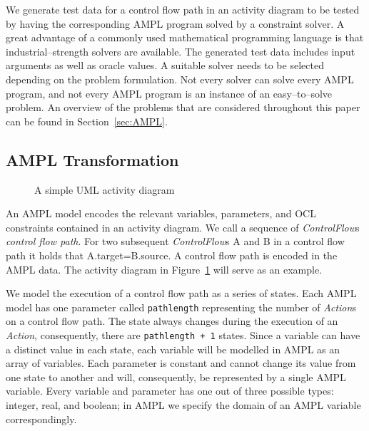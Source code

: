 \documentclass[runningheads,a4paper]{llncs}%
\newcommand{\UMLType}[1]{\textsf{\textit{#1}}} %
\newcommand{\UMLReference}[1]{\textsf{\textit{#1}}} %
\newcommand{\AMPLCode}[1]{\texttt{#1}}
\begin{document}
We generate test data for a control flow path in an activity diagram to be
tested by having the corresponding AMPL program solved by a constraint solver.
A great advantage of a commonly used mathematical programming language is that
industrial--strength solvers are available. The generated test data includes
input arguments as well as oracle values. A suitable solver needs to be selected
depending on the problem formulation. Not every solver can solve every AMPL
program, and not every AMPL program is an instance of an easy--to--solve
problem. An overview of the problems that are considered throughout this paper
can be found in Section~\ref{sec:AMPL}.
\subsection{AMPL Transformation}%
\label{sec:AMPLTransformation}%
\begin{figure}%
\def\svgwidth{\textwidth}%
\graphicspath{{./pics/}}%
%
\caption{A simple UML activity diagram}%
\label{fig:AssignmentDecision}%
\end{figure}%
An AMPL model encodes the relevant variables, parameters, and OCL constraints
contained in an activity diagram. We call a sequence of
\UMLReference{ControlFlow}s \emph{control flow path}. For two subsequent
\UMLType{ControlFlow}s A and B in a control flow path it holds that
A.target=B.source. A control flow path is encoded in the AMPL data. The
activity diagram in Figure~\ref{fig:AssignmentDecision} will serve as an
example.

We model the execution of a control flow path as a series of states. Each AMPL
model has one parameter called \AMPLCode{pathlength} representing the number of
\UMLType{Action}s on a control flow path. The state always changes during the
execution of an \UMLType{Action}, consequently, there are \AMPLCode{pathlength +
1} states. Since a variable can have a distinct value in each state, each
variable will be modelled in AMPL as an array of variables. Each parameter is
constant and cannot change its value from one state to another and will,
consequently, be represented by a single AMPL variable. Every variable and
parameter has one out of three possible types: integer, real, and boolean; in
AMPL we specify the domain of an AMPL variable correspondingly.
\end{document}

